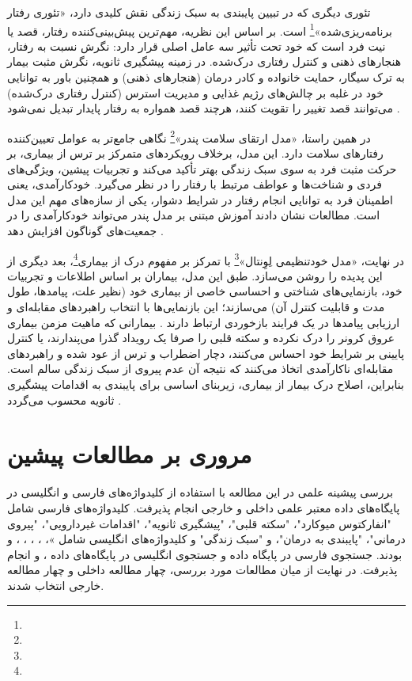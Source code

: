تئوری دیگری که در تبیین پایبندی به سبک زندگی نقش کلیدی دارد، «تئوری رفتار برنامه‌ریزی‌شده»\footnote{} است. بر اساس این نظریه، مهم‌ترین پیش‌بینی‌کننده رفتار، قصد یا نیت فرد است که خود تحت تأثیر سه عامل اصلی قرار دارد: نگرش نسبت به رفتار، هنجارهای ذهنی و کنترل رفتاری درک‌شده. در زمینه پیشگیری ثانویه، نگرش مثبت بیمار به ترک سیگار، حمایت خانواده و کادر درمان (هنجارهای ذهنی) و همچنین باور به توانایی خود در غلبه بر چالش‌های رژیم غذایی و مدیریت استرس (کنترل رفتاری درک‌شده) می‌توانند قصد تغییر را تقویت کنند، هرچند قصد همواره به رفتار پایدار تبدیل نمی‌شود \cite{Steinmetz2016TPB,Hagger2022PBC}.

در همین راستا، «مدل ارتقای سلامت پندر»\footnote{} نگاهی جامع‌تر به عوامل تعیین‌کننده رفتارهای سلامت دارد. این مدل، برخلاف رویکردهای متمرکز بر ترس از بیماری، بر حرکت مثبت فرد به سوی سبک زندگی بهتر تأکید می‌کند و تجربیات پیشین، ویژگی‌های فردی و شناخت‌ها و عواطف مرتبط با رفتار را در نظر می‌گیرد. خودکارآمدی، یعنی اطمینان فرد به توانایی انجام رفتار در شرایط دشوار، یکی از سازه‌های مهم این مدل است. مطالعات نشان دادند آموزش مبتنی بر مدل پندر می‌تواند خودکارآمدی را در جمعیت‌های گوناگون افزایش دهد \cite{Jalali2024Pender}.

در نهایت، «مدل خودتنظیمی لِوِنتال»\footnote{} با تمرکز بر مفهوم درک از بیماری\footnote{}، بعد دیگری از این پدیده را روشن می‌سازد. طبق این مدل، بیماران بر اساس اطلاعات و تجربیات خود، بازنمایی‌های شناختی و احساسی خاصی از بیماری خود (نظیر علت، پیامدها، طول مدت و قابلیت کنترل آن) می‌سازند؛ این بازنمایی‌ها با انتخاب راهبردهای مقابله‌ای و ارزیابی پیامدها در یک فرایند بازخوردی ارتباط دارند \cite{Hagger2017CSM,HaggerOrbell2022CSM}.  بیمارانی که ماهیت مزمن بیماری عروق کرونر را درک نکرده و سکته قلبی را صرفا یک رویداد گذرا می‌پندارند، یا کنترل پایینی بر شرایط خود احساس می‌کنند، دچار اضطراب و ترس از عود شده و راهبردهای مقابله‌ای ناکارآمدی اتخاذ می‌کنند که نتیجه آن عدم پیروی از سبک زندگی سالم است. بنابراین، اصلاح درک بیمار از بیماری، زیربنای اساسی برای پایبندی به اقدامات پیشگیری ثانویه محسوب می‌گردد \cite{Thomson2020CardiacBeliefs,Thagizadeh2022IllnessPerception}.



\section{مروری بر مطالعات پیشین}
\label{sec:previous-studies}


بررسی پیشینه علمی در این مطالعه با استفاده از کلیدواژه‌های فارسی و انگلیسی در پایگاه‌های داده معتبر علمی داخلی و خارجی انجام پذیرفت. کلیدواژه‌های فارسی شامل "انفارکتوس میوکارد"، "سکته قلبی"، "پیشگیری ثانویه"، "اقدامات غیردارویی"، "پیروی درمانی"، "پایبندی به درمان"، و "سبک زندگی" و کلیدواژه‌های انگلیسی شامل »، ، ، ، ، و  بودند. جستجوی فارسی در پایگاه داده  و جستجوی انگلیسی در پایگاه‌های داده ،  و  انجام پذیرفت. در نهایت از میان مطالعات مورد بررسی، چهار مطالعه داخلی و چهار مطالعه خارجی انتخاب شدند.


